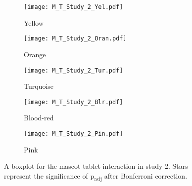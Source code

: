 \begin{figure}[hbt!]
    \centering
    \begin{subfigure}{.45\textwidth}
        \centering
        \texttt{[image: M\_T\_Study\_2\_Yel.pdf]}
        \caption{Yellow}
        \label{fig:sub1}
    \end{subfigure}\hfill%
    \begin{subfigure}{.45\textwidth}
        \centering
        \texttt{[image: M\_T\_Study\_2\_Oran.pdf]}
        \caption{Orange}
        \label{fig:sub2}
    \end{subfigure}\hfill
    \begin{subfigure}{.45\textwidth}
        \centering
        \texttt{[image: M\_T\_Study\_2\_Tur.pdf]}
        \caption{Turquoise}
        \label{fig:sub1}
    \end{subfigure}\hfill%
    \begin{subfigure}{.45\textwidth}
        \centering
        \texttt{[image: M\_T\_Study\_2\_Blr.pdf]}
        \caption{Blood-red}
        \label{fig:sub1}
    \end{subfigure}\hfill%
    \begin{subfigure}{.45\textwidth}
        \centering
        \texttt{[image: M\_T\_Study\_2\_Pin.pdf]}
        \caption{Pink}
        \label{fig:sub1}
    \end{subfigure}\hfill%
    \caption{A boxplot for the mascot-tablet interaction in study-2.
    Stars represent the significance of p\textsubscript{adj} after Bonferroni correction.}
    \label{fig:MT2}
\end{figure}

